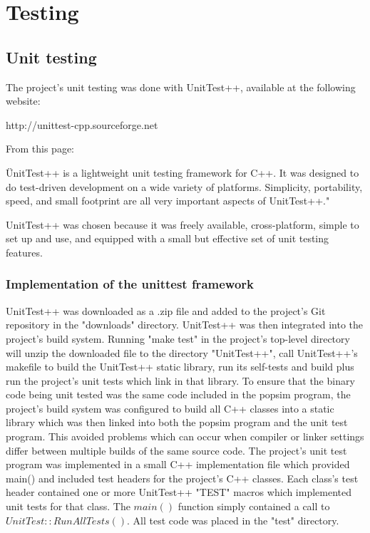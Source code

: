 \section{Testing}
\label{Testing}

\subsection{Unit testing}
\label{unittesting}

The project's unit testing was done with UnitTest++, available at the following website:
\begin{center}
 http://unittest-cpp.sourceforge.net
\end{center}
From this page:
\begin{center}
 \"UnitTest++ is a lightweight unit testing framework for C++.  It was designed to do test-driven development on a wide variety of platforms. Simplicity, portability, speed, and small footprint are all very important aspects of UnitTest++."
\end{center}

UnitTest++ was chosen because it was freely available, cross-platform, simple to set up and use, and equipped with a small but effective set of unit testing features. 
\subsubsection{Implementation of the unittest framework}
UnitTest++ was downloaded as a .zip file and added to the project's Git repository in the "downloads" directory.
UnitTest++ was then integrated into the project's build system. Running "make test" in the project's top-level directory will unzip the downloaded file to the directory "UnitTest++", call UnitTest++'s makefile to build the UnitTest++ static library, run its self-tests and build plus run the project's unit tests which link in that library.
To ensure that the binary code being unit tested was the same code included in the popsim program, the project's build system was configured to build all C++ classes into a static library which was then linked into both the popsim program and the unit test program. This avoided problems which can occur when compiler or linker settings differ between multiple builds of the same source code.
The project's unit test program was implemented in a small C++ implementation file which provided main() and included test headers for the project's C++ classes.  Each class's test header contained one or more UnitTest++ "TEST" macros which implemented unit tests for that class.  The $main()$ function simply contained a call to $UnitTest::RunAllTests()$. All test code was placed in the "test" directory.

